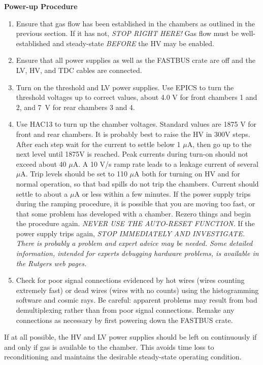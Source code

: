 \begin{center}
{\bf Power-up Procedure}
\end{center}

\begin{enumerate}
\item {Ensure that gas flow has been established in the chambers as
outlined in the previous section.  If it has not, {\it STOP RIGHT
HERE!}  Gas flow must be well-established and steady-state
{\it BEFORE} the HV may be enabled.}
\item {Ensure that all power supplies as well as the FASTBUS crate
are off and the LV, HV, and TDC cables are connected.}
\item {Turn on the threshold and LV power supplies. Use EPICS to turn the
threshold voltages up to correct values, about 4.0 V for front chambers 
1 and 2, and 7~V for rear chambers 3 and 4.}
\item {Use HAC13 to turn up the chamber voltages. Standard
values are 1875 V for front and rear chambers.
It is probably best to raise the HV in 300V steps. After each
step wait for the current to settle below 1 $\mu$A, then
go up to the next level until 1875V is reached.
Peak currents during  turn-on should not exceed about 40 $\mu$A. 
A 10 V/s ramp rate leads to a leakage current of several $\mu$A.
Trip levels should be set to 110 $\mu$A both for turning on HV and
for normal operation, so that bad spills do not trip the chambers.
Current should settle to about a $\mu$A or less within a few minutes.
If the power supply trips during the ramping procedure, it
is possible that you are moving too fast, or that some
problem has developed with a chamber.
Rezero things and begin the procedure again.
{\it NEVER USE THE AUTO-RESET FUNCTION.}}  If
the power supply trips again, {\it STOP IMMEDIATELY AND INVESTIGATE.
There is probably a problem and expert advice may be needed.
Some detailed information, intended for experts debugging hardware
problems, is available in the Rutgers web pages. }
\item {Check for poor signal connections evidenced by hot wires (wires
counting extremely fast) or dead wires (wires with no counts) using
the histogramming software and cosmic rays.
Be careful: apparent problems may result from bad demultiplexing rather than
from poor signal connections.
Remake any connections as necessary by first powering down the FASTBUS crate.}
\end{enumerate}

If at all possible, the HV and LV power supplies should be left
on continuously if and only if gas is available to the chamber.  This
avoids time loss to reconditioning and maintains the desirable
steady-state operating condition.


